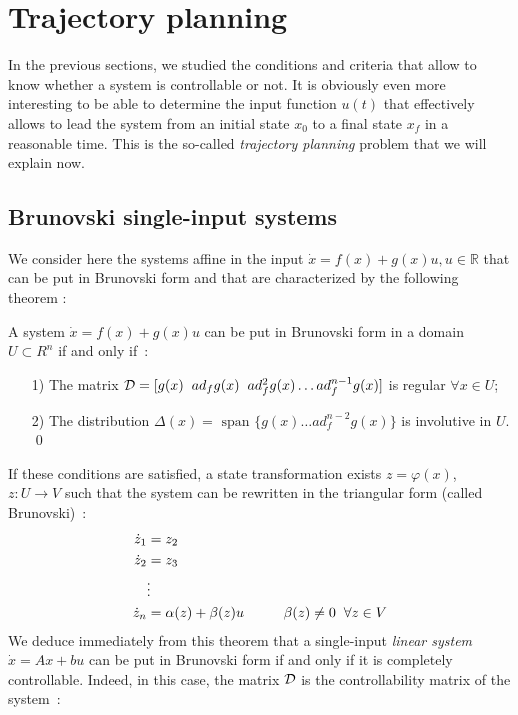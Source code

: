\section{Trajectory planning}

In the previous sections, we studied the conditions and
criteria that allow to know whether a system is controllable or not.
It is obviously even more interesting to be able to
determine the input function $u(t)$ that effectively allows to lead 
the system from an initial state $x_0$ to a final state $x_f$ in a 
reasonable time. This is the so-called {\it trajectory planning} problem 
that we will explain now.  

\subsection{Brunovski single-input systems}
We consider here the systems affine in the input  $\dot x = f(x) + g(x)u, 
u \in \mathbb{R}$ that can be put in Brunovski form and that are 
characterized by the following theorem :
\begin{theoreme}


A system $\dot x = f(x) + g(x)u$ can be put in Brunovski form
in a domain $U \subset R^n$ if and only if~:
\begin{itemize}
\item[1)] The matrix ${\cal D} = [g(x) \hspace{2mm} ad_fg(x) \hspace{2mm} ad_f^2g(x) \dots
ad_f^{n-1}g(x)]$ is regular $\forall x \in U$;
\item[2)] The distribution $\Delta(x) = \mbox{ span }\{g(x) 
 \dots ad_f^{n-2}g(x)\}$ is involutive in $U$. \qed
\end{itemize}
\end{theoreme}
If these conditions are satisfied, a state transformation exists
$z=\varphi(x)$, $z : U \longrightarrow V$ such that the system
can be rewritten in the triangular form (called Brunovski)~:
\begin{align} \label{bruno}
\dot z_1 &= z_2 \nonumber \\
\dot z_2 &= z_3  \\
&\vdots \nonumber \\
\dot z_n &= \alpha(z) + \beta(z)u \hspace{1cm} \beta(z) \neq 0 \hspace{2mm} \forall z \in
V \nonumber
\end{align}
We deduce immediately from this theorem that a single-input {\it linear system}
$\dot x = Ax + bu$ can be put in Brunovski form if and only if it is 
completely controllable. Indeed, in this case, the matrix ${\cal D}$ is the 
controllability matrix of the system~:
